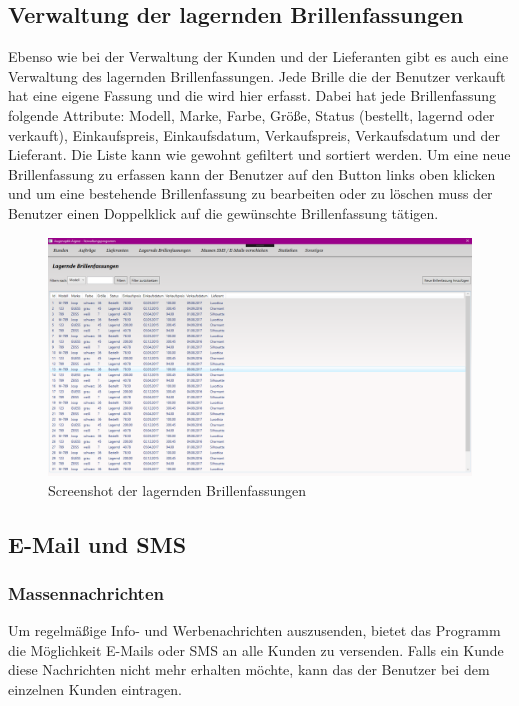 \subsection{Verwaltung der lagernden Brillenfassungen}
Ebenso wie bei der Verwaltung der Kunden und der Lieferanten gibt es auch eine Verwaltung des lagernden Brillenfassungen. Jede Brille die der Benutzer verkauft hat eine eigene Fassung und die wird hier erfasst. Dabei hat jede Brillenfassung folgende Attribute: Modell, Marke, Farbe, Größe, Status (bestellt, lagernd oder verkauft), Einkaufspreis, Einkaufsdatum, Verkaufspreis, Verkaufsdatum und der Lieferant. Die Liste kann wie gewohnt gefiltert und sortiert werden. Um eine neue Brillenfassung zu erfassen kann der Benutzer auf den Button links oben klicken und um eine bestehende Brillenfassung zu bearbeiten oder zu löschen muss der Benutzer einen Doppelklick auf die gewünschte Brillenfassung tätigen.
\begin{figure}[H]
\begin{center}
	\includegraphics[scale=.25]{images/Brillenfassungen.png}
\end{center}
	\caption{Screenshot der lagernden Brillenfassungen}
	\label{fig:sample}
\end{figure}
\subsection{E-Mail und SMS}
\subsubsection{Massennachrichten}
Um regelmäßige Info- und Werbenachrichten auszusenden, bietet das Programm die Möglichkeit E-Mails oder SMS an alle Kunden zu versenden. Falls ein Kunde diese Nachrichten nicht mehr erhalten möchte, kann das der Benutzer bei dem einzelnen Kunden eintragen.
